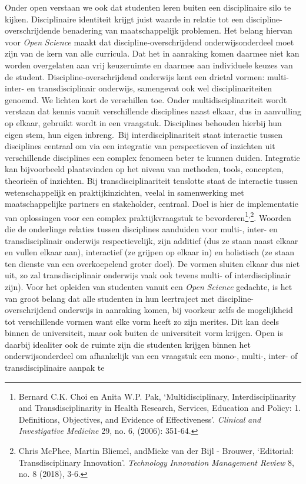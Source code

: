 \documentclass[smallauthor, chapterhaspagenum, nochapterinheader, pagenuminheader,  bigchapnum,medium2, tocpages,  garamond, titleinheader]{jote-book}
\begin{document}
	Onder open verstaan we ook dat studenten leren buiten een disciplinaire silo te kijken. Disciplinaire identiteit krijgt juist waarde in relatie tot een discipline-overschrijdende benadering van maatschappelijk problemen. Het belang hiervan voor \emph{Open }\emph{Science} maakt dat discipline-overschrijdend onderwijsonderdeel moet zijn van de kern van alle curricula. Dat het in aanraking komen daarmee niet kan worden overgelaten aan vrij keuzeruimte en daarmee aan individuele keuzes van de student. Discipline-overschrijdend onderwijs kent een drietal vormen: multi- inter- en transdisciplinair onderwijs, samengevat ook wel disciplinariteiten genoemd. We lichten kort de verschillen toe. Onder multidisciplinariteit wordt verstaan dat kennis vanuit verschillende disciplines naast elkaar, dus in aanvulling op elkaar, gebruikt wordt in een vraagstuk. Disciplines behouden hierbij hun eigen stem, hun eigen inbreng. Bij interdisciplinariteit staat interactie tussen disciplines centraal om via een integratie van perspectieven of inzichten uit verschillende disciplines een complex fenomeen beter te kunnen duiden. Integratie kan bijvoorbeeld plaatsvinden op het niveau van methoden, tools, concepten, theorieën of inzichten. Bij transdisciplinariteit tenslotte staat de interactie tussen wetenschappelijk en praktijkinzichten, veelal in samenwerking met maatschappelijke partners en stakeholder, centraal. Doel is hier de implementatie van oplossingen voor een complex praktijkvraagstuk te bevorderen\footnote{Bernard C.K. Choi en Anita W.P. Pak, ‘Multidisciplinary, Interdisciplinarity and Transdisciplinarity in Health Research, Services, Education and Policy: 1. Definitions, Objectives, and Evidence of Effectiveness'. \emph{Clinical}\emph{ }\emph{and}\emph{ }\emph{Investigative}\emph{ }\emph{Medicine} 29, no. 6, (2006): 351-64.}\textsuperscript{,}\footnote{Chris McPhee, Martin Bliemel, andMieke van der Bijl - Brouwer, ‘Editorial: Transdisciplinary Innovation'. \emph{Technology }\emph{Innovation}\emph{ Management Review} 8, no. 8 (2018), 3-6.}. Woorden die de onderlinge relaties tussen disciplines aanduiden voor multi-, inter- en transdisciplinair onderwijs respectievelijk, zijn additief (dus ze staan naast elkaar en vullen elkaar aan), interactief (ze grijpen op elkaar in) en holistisch (ze staan ten dienste van een overkoepelend groter doel). De vormen sluiten elkaar dus niet uit, zo zal transdisciplinair onderwijs vaak ook tevens multi- of interdisciplinair zijn). Voor het opleiden van studenten vanuit een \emph{Open }\emph{Science} gedachte, is het van groot belang dat alle studenten in hun leertraject met discipline-overschrijdend onderwijs in aanraking komen, bij voorkeur zelfs de mogelijkheid tot verschillende vormen want elke vorm heeft zo zijn merites. Dit kan deels binnen de universiteit, maar ook buiten de universiteit vorm krijgen. Open is daarbij idealiter ook de ruimte zijn die studenten krijgen binnen het onderwijsonderdeel om afhankelijk van een vraagstuk een mono-, multi-, inter- of transdisciplinaire aanpak te 
\end{document}
